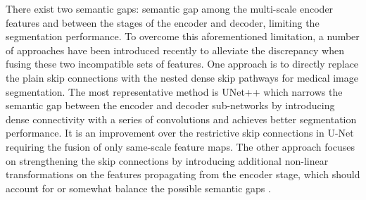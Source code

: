 \documentclass[letterpaper]{article} \usepackage{aaai22}  \usepackage{times}  \usepackage{helvet}  \usepackage{courier}  \usepackage[hyphens]{url}  \usepackage{graphicx} \urlstyle{rm} \def\UrlFont{\rm}  \usepackage{natbib}  \usepackage{caption} \DeclareCaptionStyle{ruled}{labelfont=normalfont,labelsep=colon,strut=off} \frenchspacing  \setlength{\pdfpagewidth}{8.5in}  \setlength{\pdfpageheight}{11in}  \usepackage{algorithm}
\begin{document}
	There exist two semantic gaps: semantic gap among the multi-scale encoder features and between the stages of the encoder and decoder, limiting the segmentation performance.
	To overcome this aforementioned limitation, a number of approaches have been introduced recently to alleviate the discrepancy when fusing these two incompatible sets of features.
	One approach is to directly replace the plain skip connections with the nested dense skip pathways for medical image segmentation.
	The most representative method is UNet++ \cite{UNetNestedUNet_2018} which narrows the semantic gap between the encoder and decoder sub-networks by introducing dense connectivity with a series of convolutions and achieves better segmentation performance. It is an improvement over the restrictive skip connections in U-Net requiring the fusion of only same-scale feature maps.
	The other approach focuses on strengthening the skip connections by introducing additional non-linear transformations on the features propagating from the encoder stage, which should account for or somewhat balance the possible semantic gaps \cite{MultiResUNetRethinkingUNet_2020}.
	
	
	
\end{document}
